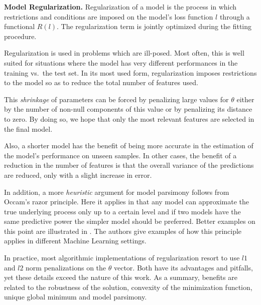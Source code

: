 \begin{definition}\textbf{Model Regularization.}
Regularization of a model is the process in which restrictions and conditions are imposed on the model's loss function $l$ through a functional $ R(l)$.
The regularization term is jointly optimized during the fitting procedure.
\end{definition}

Regularization is used in problems which are ill-posed.
Most often, this is well suited for situations where the model has very different performances in the training vs.\ the test set.
In its most used form, regularization imposes restrictions to the model so as to reduce the total number of features used.

This \textit{shrinkage} of parameters can be forced by penalizing large values for $\theta$ either by the number of non-null components of this value or by penalizing its distance to zero.
By doing so, we hope that only the most relevant features are selected in the final model.

Also, a shorter model has the benefit of being more accurate in the estimation of the model's performance on unseen samples.
In other cases, the benefit of a reduction in the number of features is that the overall variance of the predictions are reduced, only with a slight increase in error.

In addition, a more \textit{heuristic} argument for model parsimony follows from Occam's razor principle.
Here it applies in that any model can approximate the true underlying process only up to a certain level and if two models have the same predictive power the simpler model should be preferred.
Better examples on this point are illustrated in \citep{rasmussenGhahramani2001occamsRazor}.
The authors give examples  of how this principle applies in different Machine Learning settings.


In practice, most algorithmic implementations of regularization resort to use $l1$ and $l2$ norm penalizations on the $\theta$ vector.
Both have its advantages and pitfalls, yet these details exceed the nature of this work.
As a summary, benefits are related to the robustness of the solution, convexity of the minimization function, unique global minimum and model parsimony.

